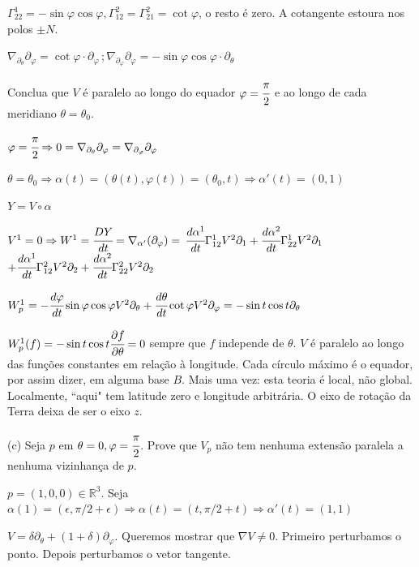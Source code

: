 \documentclass[10pt,a4paper]{article}
\begin{document}
		$\Gamma_{22}^1 = - \sin \varphi \cos \varphi, \Gamma_{12}^2 = \Gamma_{21}^2 = \cot \varphi$, o resto \'e zero. A cotangente estoura nos polos $\pm N$.

		$\nabla_{\partial_\theta} \partial_\varphi = \cot \varphi \cdot \partial_\varphi\,;\nabla_{\partial_\varphi} \partial_\varphi = - \sin \varphi \cos \varphi \cdot \partial_\theta$

		Conclua que $V$ \'e paralelo ao longo do equador $\varphi = \cfrac{\pi}{2}$ e ao longo de cada meridiano $\theta = \theta_0$.

		$\varphi = \cfrac{\pi}{2} \Rightarrow 0 = \nabla_{\partial_\theta} \partial_\varphi = \nabla_{\partial_\varphi} \partial_\varphi$

		$\theta = \theta_0 \Rightarrow \alpha(t) = (\theta(t), \varphi(t)) = (\theta_0, t) \Rightarrow \alpha'(t) = (0, 1)$

		$Y = V \circ \alpha$

		$V^1 = 0 \Rightarrow W^1 = \cfrac{DY}{dt} = \nabla_{\alpha'} (\partial_\varphi) = $
		$\cfrac{d\alpha^1}{dt} \Gamma_{12}^1 V^2 \partial_1 + \cfrac{d\alpha^2}{dt} \Gamma_{22}^1 V^2 \partial_1$
		$+ \cfrac{d\alpha^1}{dt} \Gamma_{12}^2 V^2 \partial_2 + \cfrac{d\alpha^2}{dt} \Gamma_{22}^2 V^2 \partial_2$

		$W_p^1 = - \cfrac{d\varphi}{dt} \sin \varphi \cos \varphi V^2 \partial_\theta + \cfrac{d\theta}{dt} \cot \varphi V^2 \partial_\varphi = - \sin t \cos t \partial_\theta$

		$W_p^1(f) = - \sin t \cos t \cfrac{\partial f}{\partial \theta} = 0$ sempre que $f$ independe de $\theta$. $V$ \'e paralelo ao longo das fun\c{c}\~oes constantes em rela\c{c}\~ao \`a longitude. Cada c\'irculo m\'aximo \'e o equador, por assim dizer, em alguma base $B$. Mais uma vez: esta teoria \'e local, n\~ao global. Localmente, ``aqui" tem latitude zero e longitude arbitr\'aria. O eixo de rota\c{c}\~ao da Terra deixa de ser o eixo $z$.

		\vspace{3mm}

		(c) Seja $p$ em $\theta = 0, \varphi = \cfrac{\pi}{2}$. Prove que $V_p$ n\~ao tem nenhuma extens\~ao paralela a nenhuma vizinhan\c{c}a de $p$.

		$p = (1,0,0) \in \mathbb{R}^3$. Seja $\alpha(1) = (\epsilon, \pi/2 + \epsilon) \Rightarrow \alpha(t) = (t, \pi/2 + t) \Rightarrow \alpha'(t) = (1, 1)$

		$V = \delta \partial_\theta + (1 + \delta) \partial_\varphi$. Queremos mostrar que $\nabla V \ne 0$. Primeiro perturbamos o ponto. Depois perturbamos o vetor tangente.
\end{document}
